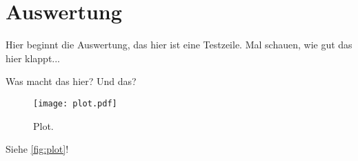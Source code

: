 \section{Auswertung}
\label{sec:Auswertung}
Hier beginnt die Auswertung, das hier ist eine Testzeile.
Mal schauen, wie gut das hier klappt...

Was macht das hier? Und das?
\begin{figure}
  \centering
  \texttt{[image: plot.pdf]}
  \caption{Plot.}
  \label{fig:plot}
\end{figure}


Siehe \autoref{fig:plot}!
